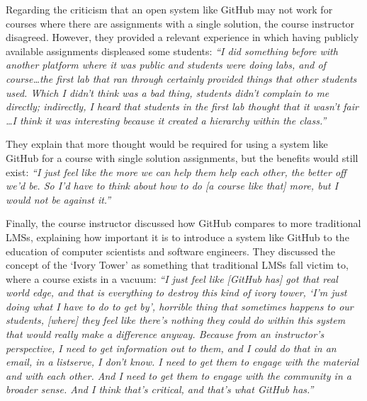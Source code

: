 Regarding the criticism that an open system like GitHub may not work for courses where there are assignments with a single solution, the course instructor disagreed. However, they provided a relevant experience in which having publicly available assignments displeased some students: \textit{``I did something before with another platform where it was public and students were doing labs, and of course\ldots the first lab that ran through certainly provided things that other students used. Which I didn't think was a bad thing, students didn't complain to me directly; indirectly, I heard that students in the first lab thought that it wasn't fair \ldots I think it was interesting because it created a hierarchy within the class.''}

They explain that more thought would be required for using a system like GitHub for a course with single solution assignments, but the benefits would still exist: \textit{``I just feel like the more we can help them help each other, the better off we'd be. So I'd have to think about how to do [a course like that] more, but I would not be against it.''}

Finally, the course instructor discussed how GitHub compares to more traditional LMSs, explaining how important it is to introduce a system like GitHub to the education of computer scientists and software engineers. They discussed the concept of the `Ivory Tower' as something that traditional LMSs fall victim to, where a course exists in a vacuum: \textit{``I just feel like [GitHub has] got that real world edge, and that is everything to destroy this kind of ivory tower, `I'm just doing what I have to do to get by', horrible thing that sometimes happens to our students, [where] they feel like there's nothing they could do within this system that would really make a difference anyway. Because from an instructor's perspective, I need to get information out to them, and I could do that in an email, in a listserve, I don't know. I need to get them to engage with the material and with each other. And I need to get them to engage with the community in a broader sense. And I think that's critical, and that's what GitHub has.''}




